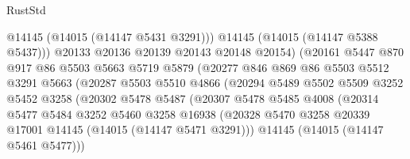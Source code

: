 \begin{lexlean}{RustStd}
\begin{coremodule}
                                  @14145
                                  (@14015 (@14147 @5431 @3291)))
                                @14145
                                (@14015 (@14147 @5388 @5437)))
                              @20133
                              @20136
                              @20139
                              @20143
                              @20148
                              @20154)
                            (@20161
                              @5447
                              @870
                              @917
                              @86
                              @5503
                              @5663
                              @5719
                              @5879
                              (@20277
                                @846
                                @869
                                @86
                                @5503
                                @5512
                                @3291
                                @5663
                                (@20287
                                  @5503
                                  @5510
                                  @4866
                                  (@20294
                                    @5489
                                    @5502
                                    @5509
                                    @3252
                                    @5452
                                    @3258
                                    (@20302
                                      @5478
                                      @5487
                                      (@20307
                                        @5478
                                        @5485
                                        @4008
                                        (@20314
                                          @5477
                                          @5484
                                          @3252
                                          @5460
                                          @3258
                                          @16938
                                          (@20328
                                            @5470
                                            @3258
                                            @20339
                                            @17001
                                            @14145
                                            (@14015 (@14147 @5471 @3291)))
                                          @14145
                                          (@14015 (@14147 @5461 @5477)))

\end{coremodule}
\end{lexlean}
